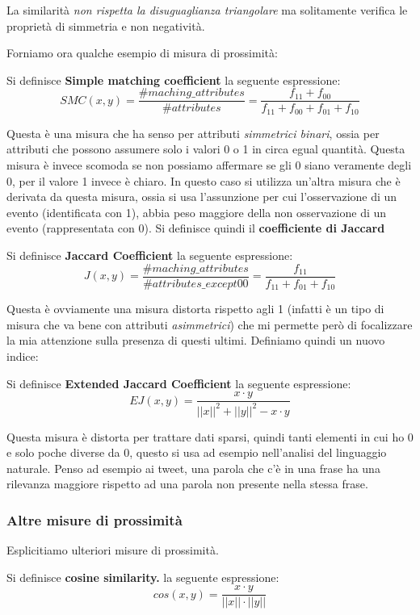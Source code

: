 La similarità \textit{non rispetta la disuguaglianza triangolare} ma solitamente verifica le proprietà di simmetria e non negatività.

Forniamo ora qualche esempio di misura di prossimità:
\begin{defn}
	 Si definisce \textbf{Simple matching coefficient} la seguente espressione: \[ SMC(x,y) = \frac{\#maching\_attributes}{\#attributes} =  \frac{f_{11}+ f_{00}}{f_{11}+ f_{00} + f_{01}+ f_{10}} \]
\end{defn}
Questa è una misura che ha senso per attributi \textit{simmetrici binari}, ossia per attributi che possono assumere solo i valori 0 o 1 in circa egual quantità.
 Questa misura è invece scomoda se non possiamo affermare se gli 0 siano veramente degli 0, per il valore 1 invece è chiaro. In questo caso si utilizza un'altra misura che è derivata da questa misura, ossia si usa l'assunzione per cui l'osservazione di un evento (identificata con 1), abbia peso maggiore della non osservazione di un evento (rappresentata con 0). Si definisce quindi il \textbf{coefficiente di Jaccard}

\begin{defn}
	Si definisce \textbf{Jaccard Coefficient} la seguente espressione:    \[ J(x,y) = \frac{\#maching\_attributes}{\#attributes\_except00} = \frac{f_{11}}{f_{11}+ f_{01}+ f_{10}}\]
\end{defn}


Questa è ovviamente una misura distorta rispetto agli 1 (infatti è un tipo di misura che va bene con attributi \textit{asimmetrici}) che mi permette però di focalizzare la mia attenzione sulla presenza di questi ultimi. 
Definiamo quindi un nuovo indice:

\begin{defn}
	Si definisce \textbf{Extended Jaccard Coefficient} la seguente espressione: \[ EJ(x,y) = \frac{x \cdot y}{||x||^2 + ||y||^2 - x \cdot y}\]
\end{defn}

 Questa misura è distorta per trattare dati sparsi, quindi tanti elementi in cui ho 0 e solo poche diverse da 0, questo si usa ad esempio nell'analisi del linguaggio naturale. Penso ad esempio ai tweet, una parola che c'è in una frase ha una rilevanza maggiore rispetto ad una parola non presente nella stessa frase.

\subsubsection{Altre misure di prossimità}
Esplicitiamo  ulteriori misure di prossimità.
\begin{defn}
	Si definisce \textbf{cosine similarity.} la seguente espressione:   \[ cos(x,y) = \frac{x \cdot y }{||x|| \cdot ||y||  } \]
\end{defn}

